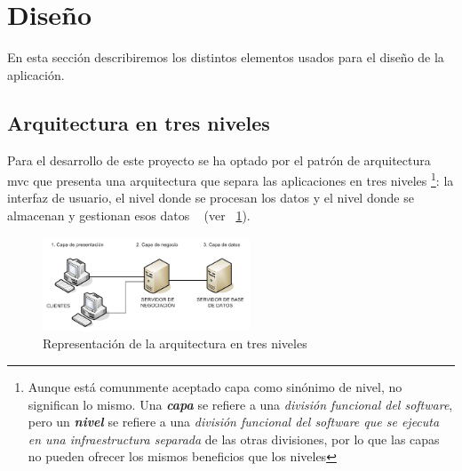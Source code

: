 \section{Diseño}
\label{sec:disenho}

En esta sección describiremos los distintos elementos usados para el diseño de la aplicación.


\subsection{Arquitectura en tres niveles}
\label{sub:arquitectura3niveles}

Para el desarrollo de este proyecto se ha optado por el patrón de arquitectura \acrlong{mvc} que presenta una arquitectura que separa las aplicaciones en tres niveles \footnote{Aunque está comunmente aceptado capa como sinónimo de nivel, no significan lo mismo. Una \textit{\textbf{capa}} se refiere a una \textit{división funcional del software}, pero un \textit{\textbf{nivel}} se refiere a una \textit{división funcional del software que se ejecuta en una infraestructura separada}  de las otras divisiones, por lo que las capas no pueden ofrecer los mismos beneficios que los niveles}: la interfaz de usuario, el nivel donde se procesan los datos y el nivel donde se almacenan y gestionan esos datos ~\cite{ibmMVC} (ver \figurename~\ref{fig:arquitectura-3-niveles}).

\begin{figure}
  \centering
  \includegraphics[width=0.55\textwidth]{imaxes/arquitectura-3-niveles.png}
  \caption{Representación de la arquitectura en tres niveles}
  \label{fig:arquitectura-3-niveles}
\end{figure}


